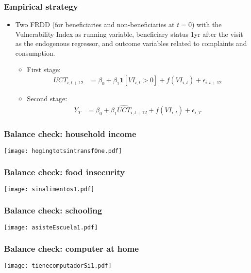 \documentclass{beamer}
\begin{document}
\begin{frame}
\frametitle{Empirical strategy}
\begin{itemize}
	\item Two FRDD (for beneficiaries and non-beneficiaries at $t=0$) with the Vulnerability Index as running variable, beneficiary status 1yr after the visit as the endogenous regressor, and outcome variables related to complaints and consumption.
	\begin{itemize}
		\item First stage:	
		\begin{align*}
		UCT_{i,t+12} & = \beta _0 + \beta_1\mathbf{1}[VI_{i,t}>0] + f(VI_{i,t}) + \epsilon_{i,t+12}
		\end{align*}
		\item Second stage:	
		\begin{align*}
		Y_{T} & = \beta _0 + \beta_1\hat{UCT}_{i,t+12} + f(VI_{i,t}) + \epsilon_{i,T}
		\end{align*}
	\end{itemize}
\end{itemize}
\end{frame}

\begin{frame}
\frametitle{Balance check: household income}
\begin{center}
	\texttt{[image: hogingtotsintransfOne.pdf]} 
	\label{hogingtotsintransfOne}
\end{center}
\end{frame}

\begin{frame}
\frametitle{Balance check: food insecurity}
\begin{center}
	\texttt{[image: sinalimentos1.pdf]} 
	\label{sinalimentos1}
\end{center}
\end{frame}

\begin{frame}
\frametitle{Balance check: schooling}
\begin{center}
	\texttt{[image: asisteEscuela1.pdf]} 
	\label{asisteEscuela1}
\end{center}
\end{frame}

\begin{frame}
\frametitle{Balance check: computer at home}
\begin{center}
	\texttt{[image: tienecomputadorSi1.pdf]} 
	\label{tienecomputadorSi1}
\end{center}
\end{frame}
\end{document}
